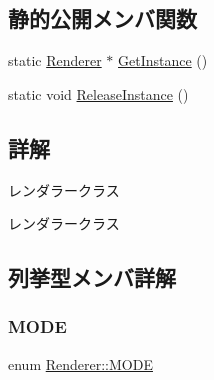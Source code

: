 \subsection*{静的公開メンバ関数}
\begin{DoxyCompactItemize}
\item 
static \mbox{\hyperlink{class_renderer}{Renderer}} $\ast$ \mbox{\hyperlink{class_renderer_a8c287bd7009d4717336ab1a9e1a556bd}{Get\+Instance}} ()
\item 
static void \mbox{\hyperlink{class_renderer_aa7ac523172faaf376ecddaed4bdc0781}{Release\+Instance}} ()
\end{DoxyCompactItemize}


\subsection{詳解}
レンダラークラス 

レンダラークラス 

\subsection{列挙型メンバ詳解}
\mbox{\label{class_renderer_ab5a9379ccadcf2b3394c61cf8c835fec}} 
\subsubsection{\texorpdfstring{M\+O\+DE}{MODE}}
{\footnotesize\ttfamily enum \mbox{\hyperlink{class_renderer_ab5a9379ccadcf2b3394c61cf8c835fec}{Renderer\+::\+M\+O\+DE}}}

